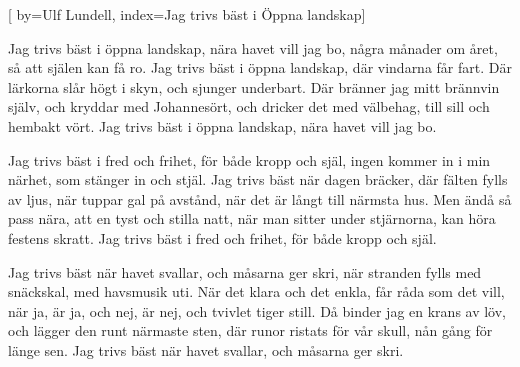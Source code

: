


[ 	%
	by={Ulf Lundell},
	index={Jag trivs bäst i Öppna landskap}]		%
	
\beginverse*
Jag trivs bäst i öppna landskap, 
nära havet vill jag bo,
några månader om året, 
så att själen kan få ro.
Jag trivs bäst i öppna landskap, 
där vindarna får fart.
Där lärkorna slår högt i skyn, 
och sjunger underbart.
Där bränner jag mitt brännvin själv, 
och kryddar med Johannesört,
och dricker det med välbehag, 
till sill och hembakt vört.
Jag trivs bäst i öppna landskap, 
nära havet vill jag bo.
\endverse

\beginverse*
Jag trivs bäst i fred och frihet, 
för både kropp och själ,
ingen kommer in i min närhet, 
som stänger in och stjäl.
Jag trivs bäst när dagen bräcker, 
där fälten fylls av ljus,
när tuppar gal på avstånd, 
när det är långt till närmsta hus.
Men ändå så pass nära, 
att en tyst och stilla natt,
när man sitter under stjärnorna, 
kan höra festens skratt.
Jag trivs bäst i fred och frihet, 
för både kropp och själ.
\endverse

\beginverse*
Jag trivs bäst när havet svallar, 
och måsarna ger skri,
när stranden fylls med snäckskal, 
med havsmusik uti.
När det klara och det enkla, 
får råda som det vill,
när ja, är ja, och nej, är nej, 
och tvivlet tiger still.
Då binder jag en krans av löv, 
och lägger den runt närmaste sten,
där runor ristats för vår skull, 
nån gång för länge sen.
Jag trivs bäst när havet svallar, 
och måsarna ger skri.
\endverse		%
\endsong			%
